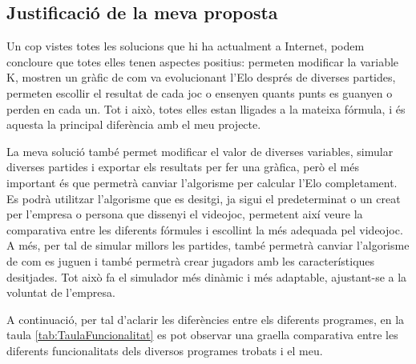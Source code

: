 \documentclass[a4paper]{article}
\begin{document}
\subsection{Justificació de la meva proposta}
Un cop vistes totes les solucions que hi ha actualment a Internet, podem concloure que totes elles tenen aspectes positius: permeten modificar la variable K,  mostren un gràfic de com va evolucionant l'Elo després de diverses partides,  permeten escollir el resultat de cada joc o ensenyen quants punts es guanyen o perden en cada un. Tot i això, totes elles estan lligades a la mateixa fórmula, i és aquesta la principal diferència amb el meu projecte.

La meva solució també permet modificar el valor de diverses variables, simular diverses partides i exportar els resultats per fer una gràfica, però el més important és que permetrà canviar l'algorisme per calcular l'Elo completament. Es podrà utilitzar l'algorisme que es desitgi, ja sigui el predeterminat o un creat per l'empresa o persona que dissenyi el videojoc, permetent així veure la comparativa entre les diferents fórmules i escollint la més adequada pel videojoc. A més, per tal de simular millors les partides, també permetrà canviar l'algorisme de com es juguen i també permetrà crear jugadors amb les característiques desitjades. Tot això fa el simulador més dinàmic i més adaptable, ajustant-se a la voluntat de l'empresa.

A continuació, per tal d'aclarir les diferències entre els diferents programes, en la taula \ref{tab:TaulaFuncionalitat} es pot observar una graella comparativa entre les diferents funcionalitats dels diversos programes trobats i el meu.
\end{document}
